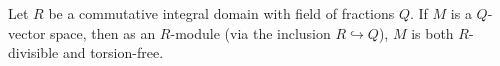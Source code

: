 Let $R$ be a commutative integral domain with field of fractions $Q$. If $M$ is a $Q$-vector space, then as an $R$-module (via the inclusion $R \hookrightarrow Q$), $M$ is both $R$-divisible and torsion-free.
